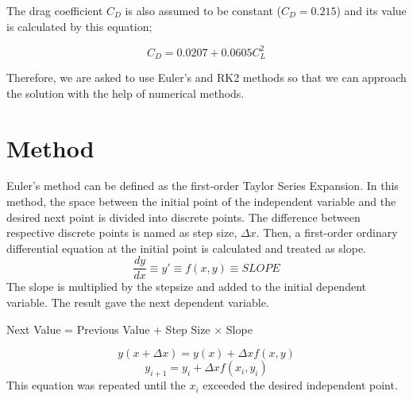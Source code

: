 \documentclass[letterpaper,12pt]{article}
\begin{document}
The drag coefficient $C_D$ is also assumed to be constant ($C_D = 0.215$) and its value is 
calculated by this equation;

\begin{equation}
        C_D = 0.0207 + 0.0605C_L^{2}
\end{equation}
        
Therefore, we are asked to use Euler's and RK2 methods so that we can approach the
solution with the help of numerical methods.


\section{Method}
Euler's method can be defined as the first-order Taylor Series Expansion. In this method, the space between
the initial point of the independent variable and the desired next point is divided into discrete points. The 
difference between respective discrete points is named as step size, $\Delta x$. Then, a first-order ordinary
differential equation at the initial point is calculated and treated as slope.
\begin{equation}
\frac{dy}{dx} \equiv y \prime \equiv f(x,y) \equiv SLOPE
\end{equation}
The slope is multiplied by the stepsize
and added to the initial dependent variable. The result gave the next dependent variable.

\begin{center}
Next Value = Previous Value + Step Size $\times $ Slope
\end{center}
\begin{equation}
y(x + \Delta x ) = y(x) + \Delta x f(x,y)
\end{equation}
\begin{equation}
y_{i+1} = y_i + \Delta x f(x_i , y_i)
\label{eq:eul}
\end{equation}
This equation was repeated until the $x_i$ exceeded the desired independent point.
\end{document}
